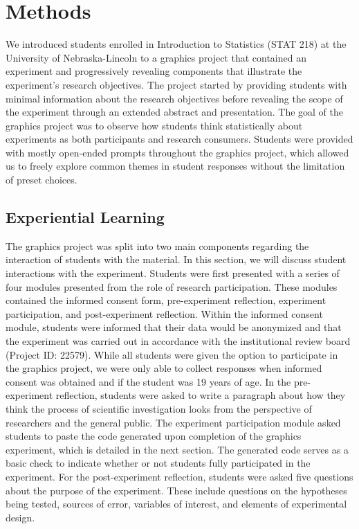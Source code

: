 \documentclass[
  12pt,
]{article}
\begin{document}
\section{Methods}\label{methods}

We introduced students enrolled in Introduction to Statistics (STAT 218)
at the University of Nebraska-Lincoln to a graphics project that
contained an experiment and progressively revealing components that
illustrate the experiment's research objectives. The project started by
providing students with minimal information about the research
objectives before revealing the scope of the experiment through an
extended abstract and presentation. The goal of the graphics project was
to observe how students think statistically about experiments as both
participants and research consumers. Students were provided with mostly
open-ended prompts throughout the graphics project, which allowed us to
freely explore common themes in student responses without the limitation
of preset choices.

\subsection{Experiential Learning}\label{experiential-learning}

The graphics project was split into two main components regarding the
interaction of students with the material. In this section, we will
discuss student interactions with the experiment. Students were first
presented with a series of four modules presented from the role of
research participation. These modules contained the informed consent
form, pre-experiment reflection, experiment participation, and
post-experiment reflection. Within the informed consent module, students
were informed that their data would be anonymized and that the
experiment was carried out in accordance with the institutional review
board (Project ID: 22579). While all students were given the option to
participate in the graphics project, we were only able to collect
responses when informed consent was obtained and if the student was 19
years of age. In the pre-experiment reflection, students were asked to
write a paragraph about how they think the process of scientific
investigation looks from the perspective of researchers and the general
public. The experiment participation module asked students to paste the
code generated upon completion of the graphics experiment, which is
detailed in the next section. The generated code serves as a basic check
to indicate whether or not students fully participated in the
experiment. For the post-experiment reflection, students were asked five
questions about the purpose of the experiment. These include questions
on the hypotheses being tested, sources of error, variables of interest,
and elements of experimental design.
\end{document}
